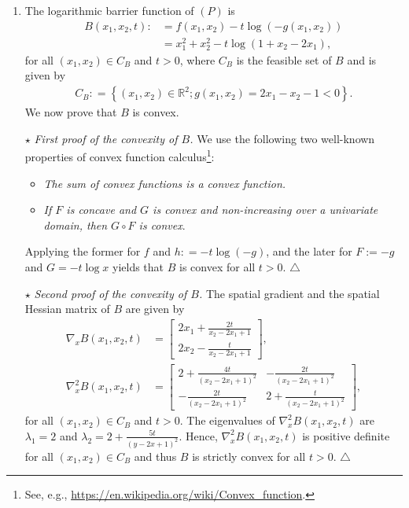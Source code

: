 \documentclass[a4paper]{article}
\numberwithin{equation}{section}
\begin{document}
\begin{enumerate}
\item The logarithmic barrier function of $\left(P\right)$ is 
\begin{align}
B\left( {{x_1},{x_2},t} \right):& = f\left( {{x_1},{x_2}} \right) - t\log \left( { - g\left( {{x_1},{x_2}} \right)} \right)\\
 &= x_1^2 + x_2^2 - t\log \left( {1 + {x_2} - 2{x_1}} \right),
\end{align}
for all $\left(x_1,x_2\right)\in C_B$ and $t>0$, where $C_B$ is the feasible set of $B$ and is given by
\begin{align}
{C_B}: = \left\{ {\left( {{x_1},{x_2}} \right) \in {\mathbb{R}^2};g\left( {{x_1},{x_2}} \right) =2x_1-x_2-1< 0} \right\}.
\end{align}
We now prove that $B$ is convex.

$\star$ \textit{First proof of the convexity of $B$.} We use the following two well-known properties of convex function calculus\footnote{See, e.g., \url{https://en.wikipedia.org/wiki/Convex_function}.}:
\begin{itemize}
\item \textit{The sum of convex functions is a convex function.}
\item \textit{If $F$ is concave and $G$ is convex and non-increasing over a univariate domain, then $G \circ F$ is convex}.
\end{itemize} 
Applying the former for $f$ and $h: =  - t\log \left( { - g} \right)$, and the later for $F:= -g$ and $G=-t\log x$ yields that $B$ is convex for all $t>0$. \hfill $\triangle$

$\star$ \textit{Second proof of the convexity of $B$.} The spatial gradient and the spatial Hessian matrix of $B$ are given by
\begin{align}
\nabla _x B\left( {{x_1},{x_2},t} \right) &= \left[ {\begin{array}{*{20}{c}}
{2{x_1} + \frac{{2t}}{{{x_2} - 2{x_1} + 1}}}\\
{2{x_2} - \frac{t}{{{x_2} - 2{x_1} + 1}}}
\end{array}} \right],\\
{\nabla _x^2}B\left( {{x_1},{x_2},t} \right) &= \left[ {\begin{array}{*{20}{c}}
{2 + \frac{{4t}}{{{{\left( {{x_2} - 2{x_1} + 1} \right)}^2}}}}&{ - \frac{{2t}}{{{{\left( {{x_2} - 2{x_1} + 1} \right)}^2}}}}\\
{ - \frac{{2t}}{{{{\left( {{x_2} - 2{x_1} + 1} \right)}^2}}}}&{2 + \frac{t}{{{{\left( {{x_2} - 2{x_1} + 1} \right)}^2}}}}
\end{array}} \right],
\end{align}
for all $\left(x_1,x_2\right)\in C_B$ and $t>0$. The eigenvalues of ${\nabla _x^2}B\left( {{x_1},{x_2},t} \right)$ are ${\lambda _1} = 2$ and ${\lambda _2} = 2 + \frac{{5t}}{{{{\left( {y - 2x + 1} \right)}^2}}}$. Hence, ${\nabla _x^2}B\left( {{x_1},{x_2},t} \right)$ is positive definite for all $\left(x_1,x_2\right)\in C_B$ and thus $B$ is strictly convex for all $t>0$. \hfill $\triangle$


\end{enumerate}
\end{document}
